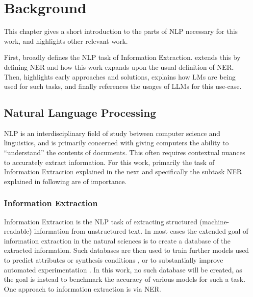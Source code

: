 \chapter{Background}\label{chap:background}

This chapter gives a short introduction to the parts of \acrlong{NLP} necessary for this work, and highlights other relevant work.

First,  broadly defines the \gls{NLP} task of Information Extraction.
 extends this by defining \gls{NER} and how this work expands upon the usual definition of \gls{NER}.
Then,  highlights early approaches and solutions,  explains how \glspl{LM} are being used for such tasks, and finally  references the usages of \glspl{LLM} for this use-case.




\section{Natural Language Processing}\label{sec:NLP}
\gls{NLP} is an interdisciplinary field of study between computer science and linguistics, and is primarily concerned with giving computers the ability to ``understand'' the contents of documents.
This often requires contextual nuances to accurately extract information.
For this work, primarily the task of Information Extraction explained in the next  and specifically the subtask \gls{NER} explained in following  are of importance.

\subsection{Information Extraction}\label{sub:extraction}
Information Extraction is the \gls{NLP} task of extracting structured (machine-readable) information from unstructured text.
In most cases the extended goal of information extraction in the natural sciences is to create a database of the extracted information.
Such databases are then used to train further models used to predict attributes or synthesis conditions \cite{luo_mof_2022}, or to substantially improve automated experimentation \cite{shi_automated_2021}.
In this work, no such database will be created, as the goal is instead to benchmark the accuracy of various models for such a task.
One approach to information extraction is via \gls{NER}.

